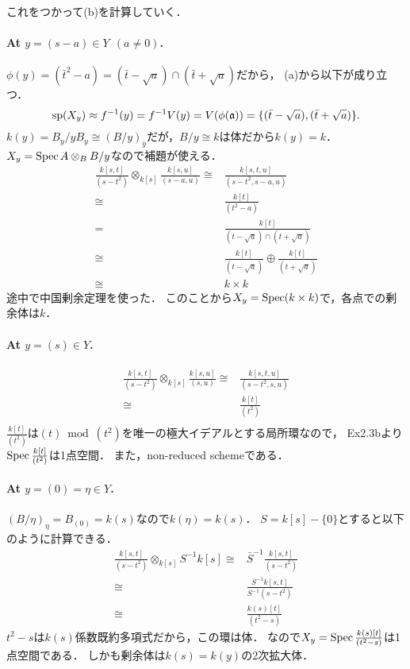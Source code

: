 \documentclass[a4paper]{jsarticle}
\newcommand{\basesp}{\operatorname{sp}}
\begin{document}
    これをつかって(b)を計算していく．
    \paragraph{At $y=(s-a) \in Y ~~(a \neq 0)$.}
    $\phi(y)=(\bar{t}^2-a)=(\bar{t}-\sqrt{a}) \cap (\bar{t}+\sqrt{a})$だから，
    (a)から以下が成り立つ．
    \[
        \basesp(X_y) \homeo
        f^{-1}(y)=f^{-1}V(y)=V(\phi(\I{a}))=\{ (\bar{t}-\sqrt{a}), (\bar{t}+\sqrt{a}) \}.
    \]
    $k(y)=B_y/yB_y \cong (B/y)_{\bar{y}}$だが，$B/y \cong k$は体だから$k(y)=k$．
    $X_y=\operatorname{Spec} A \otimes_B B/y$なので補題が使える．
    \begin{align*}
        \frac{k[s,t]}{(s-t^2)} \otimes_{k[s]} \frac{k[s,u]}{(s-a,u)}
        \cong& \frac{k[s,t,u]}{(s-t^2, s-a, u)} \\
        \cong& \frac{k[t]}{(t^2-a)} \\
        =& \frac{k[t]}{(t-\sqrt{a}) \cap (t+\sqrt{a})} \\
        \cong& \frac{k[t]}{(t-\sqrt{a})} \oplus \frac{k[t]}{(t+\sqrt{a})} \\
        \cong& k \times k
    \end{align*}
    途中で中国剰余定理を使った．
    このことから$X_y=\operatorname{Spec} (k \times k)$で，各点での剰余体は$k$．

    \paragraph{At $y=(s) \in Y$.}
    \begin{align*}
        \frac{k[s,t]}{(s-t^2)} \otimes_{k[s]} \frac{k[s,u]}{(s,u)}
        \cong& \frac{k[s,t,u]}{(s-t^2, s, u)} \\
        \cong& \frac{k[t]}{(t^2)} \\
    \end{align*}
    $\frac{k[t]}{(t^2)}$は$(t) \bmod (t^2)$を唯一の極大イデアルとする局所環なので，
    Ex2.3bより$\operatorname{Spec} \frac{k[t]}{(t^2)}$は1点空間．
    また，non-reduced schemeである．

    \paragraph{At $y=(0)=\eta \in Y$.}
    $(B/\eta)_{\eta}=B_{(0)}=k(s)$なので$k(\eta)=k(s)$．
    $S=k[s]-\{0\}$とすると以下のように計算できる．
    \begin{align*}
        \frac{k[s,t]}{(s-t^2)} \otimes_{k[s]} S^{-1}k[s]
        \cong& \bar{S}^{-1} \frac{k[s,t]}{(s-t^2)} \\
        \cong& \frac{S^{-1}k[s,t]}{S^{-1} (s-t^2)} \\
        \cong& \frac{k(s)[t]}{(t^2-s)}
    \end{align*}
    $t^2-s$は$k(s)$係数既約多項式だから，この環は体．
    なので$X_y=\operatorname{Spec} \frac{k(s)[t]}{(t^2-s)}$は1点空間である．
    しかも剰余体は$k(s)=k(y)$の2次拡大体．
\end{document}
